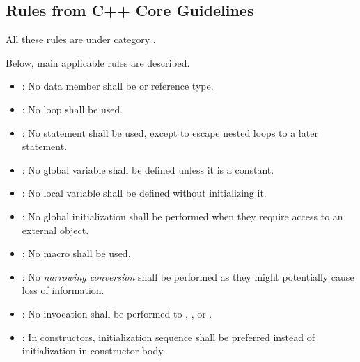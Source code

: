 \subsection{Rules from C++ Core Guidelines}

All these rules are under category
.

Below, main applicable rules are described.

\begin{itemize}

\item {}:
No data member shall be  or reference type.

\item {}:
No  loop shall be used.

\item {}:
No  statement shall be used,
except to escape nested loops to a later statement.

\item {}:
No global variable shall be defined unless it is a constant.

\item {}:
No local variable shall be defined without initializing it.

\item {}:
No global initialization shall be performed when they require access to
an external object.

\item {}:
No macro shall be used.

\item {}:
No \emph{narrowing conversion} shall be performed 
as they might potentially cause loss of information.

\item {}:
No invocation shall be performed to
, ,  or .

\item {}:
In constructors, initialization sequence shall be preferred
instead of initialization in constructor body.

\end{itemize}

